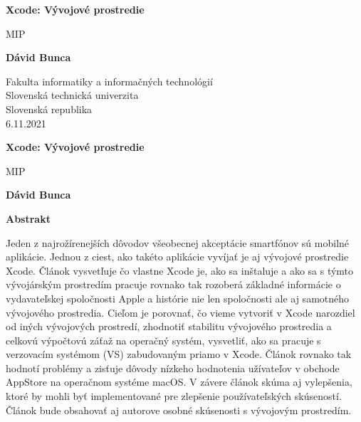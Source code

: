 \documentclass[12pt]{article}
\begin{document}
	\begin{titlepage}
   		 \begin{center}
        
            
      			  \Huge
      			  \textbf{Xcode: Vývojové prostredie}
            
     			   \vspace{0.5cm}
        			  \LARGE
				MIP
        
            
       			 \vspace{1.5cm}
            
       			 \textbf{Dávid Bunca}
            
       			 \vfill
            
            
       			 \vspace{0.8cm}

        			\centering   
            
       			 \Large
       			 Fakulta informatiky a informačných technológií\\
        			Slovenská technická univerzita\\
       			Slovenská republika\\
        			6.11.2021
            
   		 \end{center}
	\end{titlepage}

		\renewcommand*\contentsname{Obsah}
		\tableofcontents

	\newpage
		\begin{center}
   		 \Large
    		\textbf{Xcode: Vývojové prostredie}
        
   		 \vspace{0.4cm}
    		\large
    		MIP
        
   		 \vspace{0.4cm}
    		\textbf{Dávid Bunca}
       
  		  \vspace{0.9cm}
    		\textbf{Abstrakt}
	\end{center}

			Jeden z najrožírenejších dôvodov všeobecnej akceptácie smartfónov sú mobilné aplikácie. Jednou z ciest, ako takéto aplikácie vyvíjať je aj vývojové prostredie Xcode. Článok vysvetľuje čo vlastne Xcode je, ako sa inštaluje a ako sa s týmto vývojárským prostredím pracuje rovnako tak rozoberá základné informácie o vydavateľskej spoločnosti Apple a histórie nie len spoločnosti ale aj samotného vývojového prostredia. Cieľom je porovnať, čo vieme vytvoriť v Xcode narozdiel od iných vývojových prostredí, zhodnotiť stabilitu vývojového prostredia a celkovú výpočtovú záťaž na operačný systém, vysvetliť, ako sa pracuje s verzovacím systémom (VS) zabudovaným priamo v Xcode.  Článok rovnako tak hodnotí problémy a zisťuje dôvody nízkeho hodnotenia užívateľov v obchode AppStore na operačnom systéme macOS.  V závere článok skúma aj vylepšenia,  ktoré by mohli byť implementované pre zlepšenie používateľských skúseností.
Článok bude obsahovať aj autorove osobné skúsenosti s vývojovým prostredím.
\end{document}
